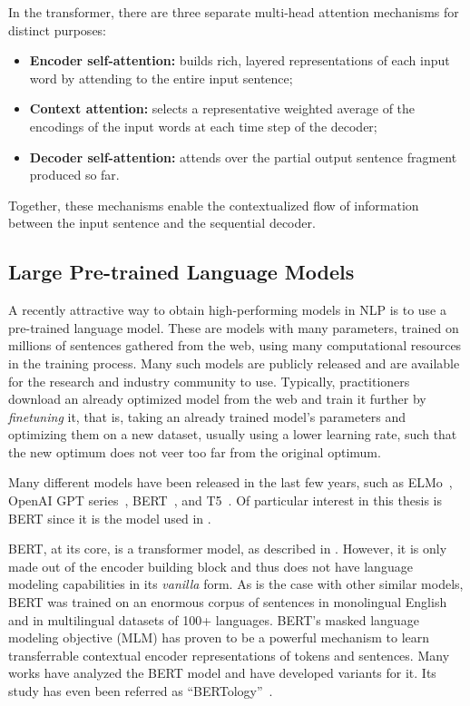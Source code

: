 In the transformer, there are three separate multi-head attention mechanisms for
distinct purposes:
%
\begin{itemize}
    \item \textbf{Encoder self-attention:} builds rich, layered representations of
          each input word by attending to the entire input sentence;
    \item \textbf{Context attention:} selects
          a representative weighted average of the encodings of the input words at each
          time step of the decoder;
    \item \textbf{Decoder self-attention:} attends over the partial output sentence
          fragment produced so far.
\end{itemize}
%
Together, these mechanisms enable the contextualized flow of information between
the input sentence and the sequential decoder.

\subsection{Large Pre-trained Language Models}
\label{sec:pretrained-bg}

\noindent A recently attractive way to obtain high-performing models in NLP is
to use a pre-trained language model. These are models with many
parameters, trained on millions of sentences gathered from
the web, using many computational resources in the training process.
Many such models are publicly released and are
available for the research and industry community to use. Typically,
practitioners download an already optimized model from the web and
train it further by \textit{finetuning} it, that is, taking an
already trained model's parameters and optimizing them on a new
dataset, usually using a lower learning rate, such that the new
optimum does not veer too far from the original optimum.

Many different models have been released in the last few years, such
as ELMo~\citep{peters2018deep}, OpenAI GPT
series~\citep{radford2018improving, brown2020language},
BERT~\citep{devlin2018bert}, and
T5~\citep{raffel2020Exploringlimitstransfer}. Of particular interest
in this thesis is BERT since it is the model used in
.

BERT, at its core, is a transformer model, as described in
. However, it is only made out of the
encoder building block and thus does not have language modeling
capabilities in its \textit{vanilla} form. As is the case with other
similar models, BERT was trained on an enormous corpus of sentences
in monolingual English and in multilingual datasets of 100+
languages. BERT's masked language modeling objective (MLM) has proven
to be a powerful mechanism to learn transferrable contextual encoder
representations of tokens and sentences. Many works have analyzed
the BERT model and have developed variants for it. Its study has even
been referred as ``BERTology''~\citep{rogers2020PrimerBERTologyWhat}.
